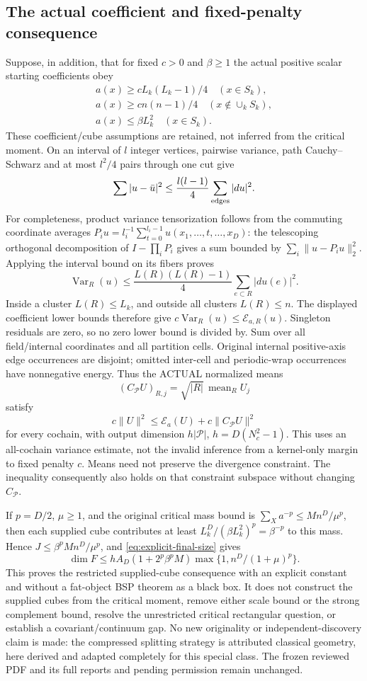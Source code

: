 \subsection{The actual coefficient and fixed-penalty consequence}
Suppose, in addition, that for fixed $c>0$ and $\beta\geq1$ the actual
positive scalar starting coefficients obey
\[
 \begin{gathered}
 a(x)\geq cL_k(L_k-1)/4\quad(x\in S_k),\\
 a(x)\geq cn(n-1)/4\quad(x\notin\cup_k S_k),\\
 a(x)\leq\beta L_k^2\quad(x\in S_k).
 \end{gathered}
\]
These coefficient/cube assumptions are retained, not inferred from the
critical moment. On an interval of $l$ integer vertices, pairwise variance,
path Cauchy--Schwarz and at most $l^2/4$ pairs through one cut give
\[
 \sum|u-\bar u|^2\leq\frac{l(l-1)}4\sum_{\rm edges}|du|^2.
\]
For completeness, product variance tensorization follows from the commuting
coordinate averages $P_i u=l_i^{-1}\sum_{t=0}^{l_i-1}u(x_1,\ldots,t,\ldots,x_D)$: the telescoping orthogonal decomposition of
$I-\prod_iP_i$ gives a sum bounded by
$\sum_i\|u-P_i u\|_2^2$. Applying the interval bound on its fibers proves
\[
 \operatorname{Var}_R(u)\leq\frac{L(R)(L(R)-1)}4
                      \sum_{e\subset R}|du(e)|^2.
\]
Inside a cluster $L(R)\leq L_k$, and outside all clusters $L(R)\leq n$.
The displayed coefficient lower bounds therefore give
$c\operatorname{Var}_R(u)\leq\mathcal E_{a,R}(u)$.
Singleton residuals are zero, so no zero lower bound is divided by.
Sum over all field/internal coordinates and all partition cells. Original
internal positive-axis edge occurrences are disjoint; omitted inter-cell
and periodic-wrap occurrences have nonnegative energy. Thus the ACTUAL
normalized means
\[
 (C_{\mathcal P}U)_{R,j}=\sqrt{|R|}\,\operatorname{mean}_R U_j
\]
satisfy
\[
 c\|U\|^2\leq\mathcal E_a(U)+c\|C_{\mathcal P}U\|^2
\]
for every cochain, with output dimension $h|\mathcal P|$,
$h=D(N_c^2-1)$. This uses an all-cochain variance estimate, not the invalid
inference from a kernel-only margin to fixed penalty $c$. Means need not
preserve the divergence constraint. The inequality consequently also
holds on that constraint subspace without changing $C_{\mathcal P}$.

If $p=D/2$, $\mu\geq1$, and the original critical mass bound is
$\sum_Xa^{-p}\leq Mn^D/\mu^p$, then each supplied cube contributes
at least $L_k^D/(\beta L_k^2)^p=\beta^{-p}$ to this mass. Hence
$J\leq\beta^pMn^D/\mu^p$, and \eqref{eq:explicit-final-size} gives
\[
 \dim F\leq hA_D(1+2^p\beta^pM)
                   \max\{1,n^D/(1+\mu)^p\}.
\]
This proves the restricted supplied-cube consequence with an explicit
constant and without a fat-object BSP theorem as a black box. It does
not construct the supplied cubes from the critical moment, remove either
scale bound or the strong complement bound, resolve the unrestricted
critical rectangular question, or establish a covariant/continuum gap.
No new originality or independent-discovery claim is made: the compressed
splitting strategy is attributed classical geometry, here derived and
adapted completely for this special class. The frozen reviewed PDF and
its full reports and pending permission remain unchanged.
